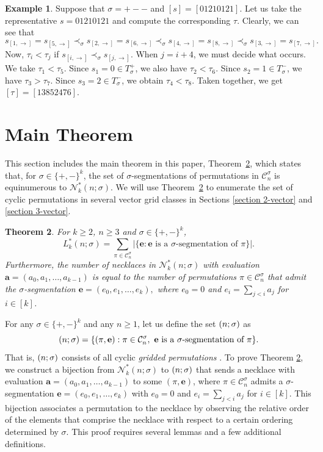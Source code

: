 \documentclass[12pt]{article}
\newcommand{\todo}[1]{\vspace{2 mm}\par\noindent
   \marginpar[\flushright\textsc{ToDo}]{\textsc{ToDo}}\framebox{\begin{minipage}[c]{\textwidth}
   \tt #1 \end{minipage}}\vspace{2 mm}\par}
\let\SS\relax
\DeclareMathOperator{\SS}{Seg}
\newcommand{\C}{\mathcal{C}}
\newcommand{\N}{\mathcal{N}}
\newcommand{\e}{\mathbf{e}}
\theoremstyle{plain}
\newtheorem{theorem}{Theorem}
\theoremstyle{definition}
\newtheorem{example}[theorem]{Example}
\begin{document}
\begin{example}\label{ex: not prim}
 Suppose that $\sigma = +--$ and $[s]=[01210121]$. Let us take the representative $s=01210121$ and compute the corresponding $\tau$. Clearly, we can see that 
$$
s_{[1,\rightarrow]}= s_{[5,\rightarrow]} \prec_\sigma s_{[2,\rightarrow]}= s_{[6,\rightarrow]} \prec_\sigma s_{[4,\rightarrow]}= s_{[8,\rightarrow]} \prec_\sigma s_{[3,\rightarrow]}=s_{[7,\rightarrow]}.
$$ 
Now, $\tau_i<\tau_j$ if $s_{[i,\rightarrow]}\prec_\sigma s_{[j,\rightarrow]}$. When $j=i+4$, we must decide what occurs. We take $\tau_1<\tau_5$. Since $s_1=0\in T_\sigma^+$, we also have $\tau_2<\tau_6$. Since $s_2=1\in T_\sigma^-$, we have $\tau_3>\tau_7$. Since $s_3=2\in T_\sigma^-$, we obtain $\tau_4<\tau_8$. Taken together, we get $[\tau]=[13852476]$.
\end{example}


\section{Main Theorem}\label{section main theorem}
This section includes the main theorem in this paper, Theorem~\ref{BIJECTION BETWEEN WORDS AND SIGSEG}, which states that, for $\sigma \in \{+,-\}^k$, the set of $\sigma$-segmentations of permutations in $\mathcal C_n^\sigma$ is equinumerous to $\N^*_k(n;\sigma)$. We will use Theorem~\ref{BIJECTION BETWEEN WORDS AND SIGSEG} to enumerate the set of cyclic permutations in several vector grid classes in Sections \ref{section 2-vector} and \ref{section 3-vector}.  

\begin{theorem}\label{BIJECTION BETWEEN WORDS AND SIGSEG}
For $k \geq 2$, $n \geq3$ and $\sigma \in \{+,-\}^k$,
	\[L_k^*(n;\sigma)= \sum_{\pi \in \mathcal C_n^\sigma} |\{\e: \e \text{ is a $\sigma$-segmentation of $\pi$}\}|.\]
Furthermore, the number of necklaces in $\N^*_k(n;\sigma)$ with evaluation $\textbf{a}=(a_0, a_1,\ldots, a_{k-1})$ is equal to the number of permutations $\pi \in\C_n^\sigma$ that admit the $\sigma$-segmentation $\e=(e_0, e_1,\ldots, e_k),$ where $e_0=0$ and $e_i = \displaystyle\sum_{j<i} a_j$ for $i\in[k]$.
\end{theorem}



For any $\sigma\in\{+,-\}^k$ and any $n\geq 1$, let us define the set $\SS(n;\sigma)$ as $$\SS(n;\sigma)=\{(\pi,\mathbf{e}) : \pi\in\C_n^\sigma, \ \mathbf{e} \text{ is a $\sigma$-segmentation of $\pi$}\}.$$
That is, $\SS(n;\sigma)$ consists of all cyclic \textit{gridded permutations} \cite{AAVRB,BEVAN2014,BEVAN2015}.  To prove Theorem \ref{BIJECTION BETWEEN WORDS AND SIGSEG}, we construct a bijection from $\N^*_k(n;\sigma)$ to $\SS(n;\sigma)$ that sends a necklace with evaluation $\textbf{a} =(a_0, a_1,\ldots, a_{k-1})$ to some $(\pi, \e)$, where $\pi \in\C_n^\sigma$ admits a $\sigma$-segmentation $\e=(e_0, e_1,\ldots, e_k)$ with $e_0=0$ and $e_i = \sum_{j<i} a_j$ for $i\in[k]$. This bijection  associates a permutation to the necklace by observing the relative order of the elements that comprise the necklace with respect to a certain ordering determined by $\sigma$. This proof requires several lemmas and a few additional definitions.
\end{document}
